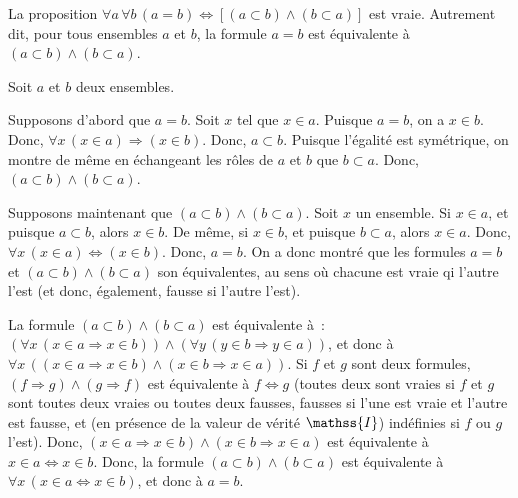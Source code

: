 \noindent{} La proposition $\forall a \, \forall b \, (a = b) \Leftrightarrow [(a \subset b) \wedge (b \subset a)]$ est vraie.
    Autrement dit, pour tous ensembles $a$ et $b$, la formule $a = b$ est équivalente à $(a \subset b) \wedge (b \subset a)$.

\blank[medium]

\noindent{} 
    Soit $a$ et $b$ deux ensembles. 
    \startitemize[nowhite]
      \item Supposons d'abord que $a = b$.
          Soit $x$ tel que $x \in a$. 
          Puisque $a = b$, on a $x \in b$. 
          Donc, $\forall x \, (x \in a) \Rightarrow (x \in b)$.
          Donc, $a \subset b$. 
          Puisque l'égalité est symétrique, on montre de même en échangeant les rôles de $a$ et $b$ que $b \subset a$.
          Donc, $(a \subset b) \wedge (b \subset a)$. 
      \item Supposons maintenant que $(a \subset b) \wedge (b \subset a)$. 
          Soit $x$ un ensemble. 
          Si $x \in a$, et puisque $a \subset b$, alors $x \in b$.
          De même, si $x \in b$, et puisque $b \subset a$, alors $x \in a$.
          Donc, $\forall x \, (x \in a) \Leftrightarrow (x \in b)$. 
          Donc, $a = b$. 
    \stopitemize
    On a donc montré que les formules $a = b$ et $(a \subset b) \wedge (b \subset a)$ son équivalentes, au sens où chacune est vraie qi l'autre l'est (et donc, également, fausse si l'autre l'est).

   \done 

\blank[medium]

\noindent{} 
    La formule $(a \subset b) \wedge (b \subset a)$ est équivalente à : $(\forall x \, (x \in a \Rightarrow x \in b)) \wedge (\forall y \, (y \in b \Rightarrow y \in a))$, et donc à $\forall x \, ((x \in a \Rightarrow x \in b) \wedge (x \in b \Rightarrow x \in a))$. 
    Si $f$ et $g$ sont deux formules, $(f \Rightarrow g) \wedge (g \Rightarrow f)$ est équivalente à $f \Leftrightarrow g$ (toutes deux sont vraies si $f$ et $g$ sont toutes deux vraies ou toutes deux fausses, fausses si l'une est vraie et l'autre est fausse, et (en présence de la valeur de vérité $\mathss{I}$) indéfinies si $f$ ou $g$ l'est).
    Donc, $(x \in a \Rightarrow x \in b) \wedge (x \in b \Rightarrow x \in a)$ est équivalente à $x \in a \Leftrightarrow x \in b$.
    Donc, la formule $(a \subset b) \wedge (b \subset a)$ est équivalente à $\forall x \, (x \in a \Leftrightarrow x \in b)$, et donc à $a = b$.

